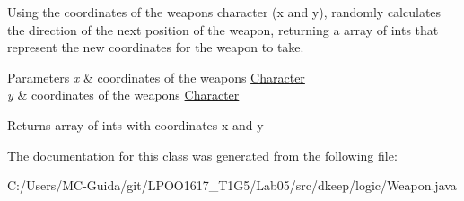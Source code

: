 Using the coordinates of the weapon\textquotesingle{}s character (x and y), randomly calculates the direction of the next position of the weapon, returning a array of ints that represent the new coordinates for the weapon to take. 
\begin{DoxyParams}{Parameters}
{\em x} & coordinates of the weapon\textquotesingle{}s \hyperlink{classdkeep_1_1logic_1_1_character}{Character} \\
\hline
{\em y} & coordinates of the weapon\textquotesingle{}s \hyperlink{classdkeep_1_1logic_1_1_character}{Character} \\
\hline
\end{DoxyParams}
\begin{DoxyReturn}{Returns}
array of ints with coordinates x and y 
\end{DoxyReturn}


The documentation for this class was generated from the following file\+:\begin{DoxyCompactItemize}
\item 
C\+:/\+Users/\+M\+C-\/\+Guida/git/\+L\+P\+O\+O1617\+\_\+\+T1\+G5/\+Lab05/src/dkeep/logic/Weapon.\+java\end{DoxyCompactItemize}
